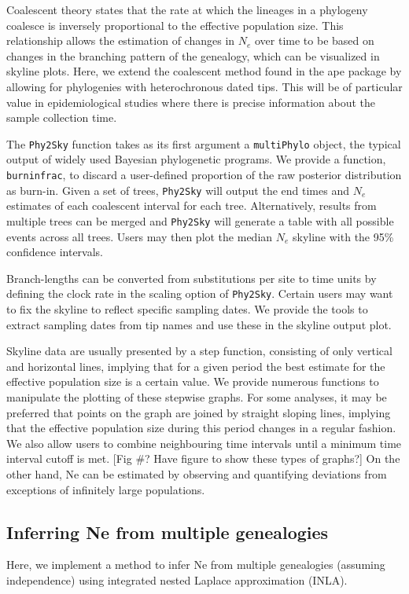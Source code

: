 \documentclass[english,titlepage]{article}
\begin{document}
Coalescent theory states that the rate at which the lineages in a phylogeny coalesce is inversely proportional to the effective population size. This relationship allows the estimation of changes in $N_e$ over time to be based on changes in the branching pattern of the genealogy, which can be visualized in skyline plots. Here, we extend the coalescent method found in the ape package \citep{Paradis2004} by allowing for phylogenies with heterochronous dated tips. This will be of particular value in epidemiological studies where there is precise information about the sample collection time.


The \texttt{Phy2Sky} function takes as its first argument a \texttt{multiPhylo} object, the typical output of widely used Bayesian phylogenetic programs. We provide a function, \texttt{burninfrac}, to discard a user-defined proportion of the raw posterior distribution as burn-in. Given a set of trees, \texttt{Phy2Sky} will output the end times and $N_e$ estimates of each coalescent interval for each tree. Alternatively, results from multiple trees can be merged and \texttt{Phy2Sky} will generate a table with all possible events across all trees. Users may then plot the median $N_e$ skyline with the 95\% confidence intervals.

Branch-lengths can be converted from substitutions per site to time units by defining the clock rate in the scaling option of \texttt{Phy2Sky}. Certain users may want to fix the skyline to reflect specific sampling dates. We provide the tools to extract sampling dates from tip names and use these in the skyline output plot.

Skyline data are usually presented by a step function, consisting of only vertical and horizontal lines, implying that for a given period the best estimate for the effective population size is a certain value. We provide numerous functions to manipulate the plotting of these stepwise graphs. For some analyses, it may be preferred that points on the graph are joined by straight sloping lines, implying that the effective population size during this period changes in a regular fashion. We also allow users to combine neighbouring time intervals until a minimum time interval cutoff is met. [Fig \#? Have figure to show these types of graphs?] 
On the other hand, Ne can be estimated by observing and quantifying deviations from exceptions of infinitely large populations. 
  
\subsection*{Inferring Ne from multiple genealogies}
Here, we implement a method to infer Ne from multiple genealogies (assuming independence) using integrated nested Laplace approximation (INLA).
\end{document}
